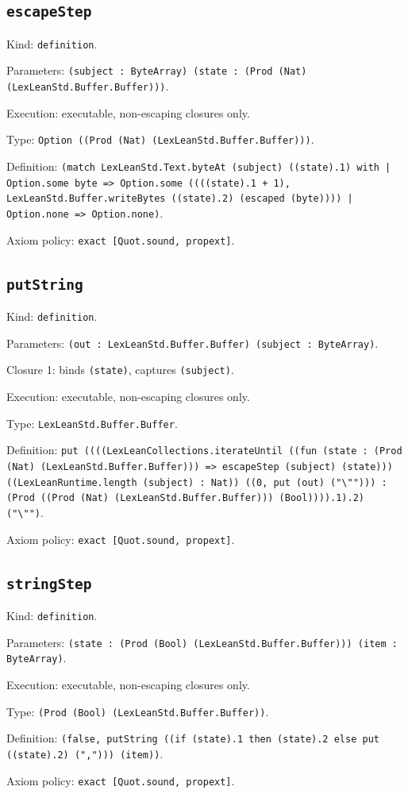 \documentclass[11pt]{article}
\begin{document}
\subsection*{\texttt{escapeStep}}
\noindent Kind: \texttt{definition}.\par
\noindent Parameters: \texttt{(subject : ByteArray) (state : (Prod (Nat) (LexLeanStd.Buffer.Buffer)))}.\par
\noindent Execution: executable, non-escaping closures only.\par
\noindent Type: \texttt{Option ((Prod (Nat) (LexLeanStd.Buffer.Buffer)))}.\par
\noindent Definition: \texttt{(match LexLeanStd.Text.byteAt (subject) ((state).1) with | Option.some byte => Option.some ((((state).1 + 1), LexLeanStd.Buffer.writeBytes ((state).2) (escaped (byte)))) | Option.none => Option.none)}.\par
\noindent Axiom policy: \texttt{exact [Quot.sound, propext]}.\par
\subsection*{\texttt{putString}}
\noindent Kind: \texttt{definition}.\par
\noindent Parameters: \texttt{(out : LexLeanStd.Buffer.Buffer) (subject : ByteArray)}.\par
\noindent Closure 1: binds \texttt{(state)}, captures \texttt{(subject)}.\par
\noindent Execution: executable, non-escaping closures only.\par
\noindent Type: \texttt{LexLeanStd.Buffer.Buffer}.\par
\noindent Definition: \texttt{put ((((LexLeanCollections.iterateUntil ((fun (state : (Prod (Nat) (LexLeanStd.Buffer.Buffer))) => escapeStep (subject) (state))) ((LexLeanRuntime.length (subject) : Nat)) ((0, put (out) ("\textbackslash{}""))) : (Prod ((Prod (Nat) (LexLeanStd.Buffer.Buffer))) (Bool)))).1).2) ("\textbackslash{}"")}.\par
\noindent Axiom policy: \texttt{exact [Quot.sound, propext]}.\par
\subsection*{\texttt{stringStep}}
\noindent Kind: \texttt{definition}.\par
\noindent Parameters: \texttt{(state : (Prod (Bool) (LexLeanStd.Buffer.Buffer))) (item : ByteArray)}.\par
\noindent Execution: executable, non-escaping closures only.\par
\noindent Type: \texttt{(Prod (Bool) (LexLeanStd.Buffer.Buffer))}.\par
\noindent Definition: \texttt{(false, putString ((if (state).1 then (state).2 else put ((state).2) (","))) (item))}.\par
\noindent Axiom policy: \texttt{exact [Quot.sound, propext]}.\par
\end{document}

